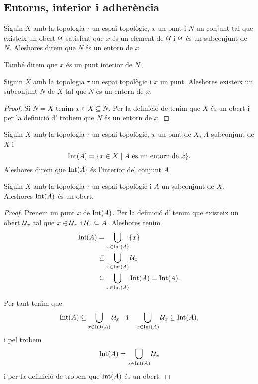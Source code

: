 \documentclass[../../Main.tex]{subfiles}
\begin{document}
	\subsection{Entorns, interior i adherència}
	\begin{definition}[Entorn]
		\label{def:entorn}
		\label{def:punt interior}
		Siguin \(X\) amb la topologia \(\tau\) un espai topològic, \(x\) un punt i \(N\) un conjunt tal que existeix un obert \(\mathcal{U}\) satisfent que \(x\) és un element de \(\mathcal{U}\) i \(\mathcal{U}\) és un subconjunt de \(N\). Aleshores direm que \(N\) és un entorn de \(x\).
		
		També direm que \(x\) és un punt interior de \(N\).
	\end{definition}
	\begin{observation}
		\label{obs:tot punt té un entorn}
		Siguin \(X\) amb la topologia \(\tau\) un espai topològic i \(x\) un punt. Aleshores existeix un subconjunt \(N\) de \(X\) tal que \(N\) és un entorn de \(x\).
		\begin{proof}
			Si \(N=X\) tenim \(x\in X\subseteq N\). Per la definició de  tenim que \(X\) és un obert i per la definició d' trobem que \(N\) és un entorn de \(x\).
		\end{proof}
	\end{observation}
	\begin{definition}[Interior]
		\label{def:interior}
		Siguin \(X\) amb la topologia \(\tau\) un espai topològic, \(x\) un punt de \(X\), \(A\) subconjunt de \(X\) i
		\[
		    \operatorname{Int}(A)=\{x\in X\mid A\text{ és un entorn de }x\}.
		\]
		Aleshores direm que \(\operatorname{Int}(A)\) és l'interior del conjunt \(A\).
	\end{definition}
	\begin{proposition}
		\label{prop:l'interior d'un conjunt és un obert}
		Siguin \(X\) amb la topologia \(\tau\) un espai topològic i \(A\) un subconjunt de \(X\). Aleshores \(\operatorname{Int}(A)\) és un obert.
		\begin{proof}
			Prenem un punt \(x\) de \(\operatorname{Int}(A)\). Per la definició d' tenim que existeix un obert \(\mathcal{U}_{x}\) tal que \(x\in\mathcal{U}_{x}\) i \(\mathcal{U}_{x}\subseteq A\). Aleshores tenim
			\begin{align*}
				\operatorname{Int}(A)&=\bigcup_{x\in\operatorname{Int}(A)}\{x\} \\
				&\subseteq\bigcup_{x\in\operatorname{Int}(A)}\mathcal{U}_{x} \\
				&\subseteq\bigcup_{x\in\operatorname{Int}(A)}\operatorname{Int}(A)=\operatorname{Int}(A).
			\end{align*}
			
			Per tant tenim que
			\[
			    \operatorname{Int}(A)\subseteq\bigcup_{x\in\operatorname{Int}(A)}\mathcal{U}_{x}\quad\text{i}\quad\bigcup_{x\in\operatorname{Int}(A)}\mathcal{U}_{x}\subseteq\operatorname{Int}(A),
			\]
			i pel  trobem
			\[
			    \operatorname{Int}(A)=\bigcup_{x\in\operatorname{Int}(A)}\mathcal{U}_{x}
			\]
			i per la definició de  trobem que \(\operatorname{Int}(A)\) és un obert.
		\end{proof}
	\end{proposition}
\end{document}
